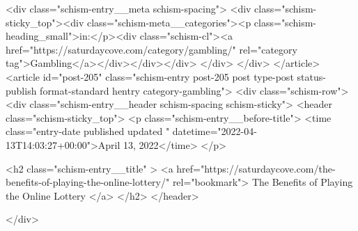 {		<div class="schism-entry__meta schism-spacing">			<div class="schism-sticky_top"><div class="schism-meta__categories"><p class="schism-heading_small">in:</p><div class="schism-cl"><a href="https://saturdaycove.com/category/gambling/" rel="category tag">Gambling</a></div></div></div>		</div>
	</div>
</article>
<article id="post-205" class="schism-entry post-205 post type-post status-publish format-standard hentry category-gambling">
	<div class="schism-row">		<div class="schism-entry__header schism-spacing schism-sticky">			<header class="schism-sticky_top">				<p class="schism-entry__before-title">
					<time class="entry-date published updated " datetime="2022-04-13T14:03:27+00:00">April 13, 2022</time>				</p>

				<h2 class="schism-entry__title" >
					<a href="https://saturdaycove.com/the-benefits-of-playing-the-online-lottery/" rel="bookmark">
						The Benefits of Playing the Online Lottery					</a>
				</h2>
			</header>

					</div>

}
